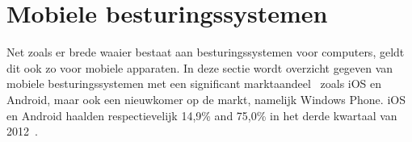 




\section{Mobiele besturingssystemen}
\label{sec:mobiele-besturingssystemen}
Net zoals er brede waaier bestaat aan besturingssystemen voor computers, geldt dit ook zo voor mobiele apparaten. 
In deze sectie wordt overzicht gegeven van mobiele besturingssystemen met een significant marktaandeel~\cite{David2011, Hales2012} zoals iOS en Android, maar ook een nieuwkomer op de markt, namelijk Windows Phone.
iOS en Android haalden respectievelijk 14,9\% and 75,0\% in het derde kwartaal van 2012~\cite{Protalinski2012}.

